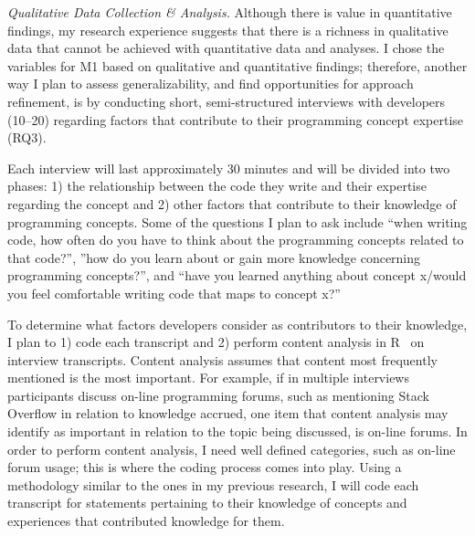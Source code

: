 \documentclass{llncs}
\begin{document}
\vspace{0.5em}

\noindent\textit{Qualitative Data Collection \& Analysis.}
Although there is value in quantitative findings, my research experience suggests that there is a richness in qualitative data that cannot be achieved with quantitative data and analyses.
I chose the variables for M1 based on qualitative and quantitative findings; therefore, another way I plan to assess generalizability, and find opportunities for approach refinement, is by conducting short, semi-structured interviews with developers (10--20) regarding factors that contribute to their programming concept expertise (RQ3). 

Each interview will last approximately 30 minutes and will be divided into two phases: 1) the relationship between the code they write and their expertise regarding the concept and 2) other factors that contribute to their knowledge of programming concepts. Some of the questions I plan to ask include ``when writing code, how often do you have to think about the programming concepts related to that code?'', ''how do you learn about or gain more knowledge concerning programming concepts?'', and ``have you learned anything about concept x/would you feel comfortable writing code that maps to concept x?''

To determine what factors developers consider as contributors to their knowledge, I plan to 1) code each transcript and 2) perform content analysis in R~\cite{RSoftware} on interview transcripts. Content analysis assumes that content most frequently mentioned is the most important. For example, if in multiple interviews participants discuss on-line programming forums, such as mentioning Stack Overflow in relation to knowledge accrued, one item that content analysis may identify as important in relation to the topic being discussed, is on-line forums. In order to perform content analysis, I need well defined categories, such as on-line forum usage; this is where the coding process comes into play. Using a methodology similar to the ones in my previous research, I will code each transcript for statements pertaining to their knowledge of concepts and experiences that contributed knowledge for them. 
\end{document}
